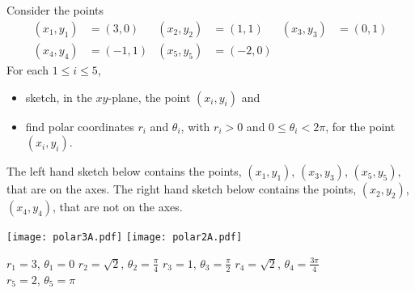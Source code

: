 
\newcommand{\he}{\hat{\mathbf{e}}}



\subsection*{\Conceptual}


\begin{question}
Consider the points
\begin{align*}
(x_1,y_1) &= (3,0) &
(x_2,y_2) &= (1,1)  &
(x_3,y_3) &= (0,1) \\
(x_4,y_4) &= (-1,1) &
(x_5,y_5) &= (-2,0)
\end{align*}
For each $1\le i\le 5$, 
\begin{itemize}
\item
sketch, in the $xy$-plane, the point $(x_i,y_i)$ and
\item
find polar coordinates $r_i$ and $\theta_i$,
with $r_i>0$ and $0\le\theta_i<2\pi$, for the point $(x_i,y_i)$.
\end{itemize}
\end{question}


\begin{answer} 
The left hand sketch below contains the points, $(x_1,y_1)$, $(x_3,y_3)$,
$(x_5,y_5)$, that are on the axes. The right hand sketch below contains the
points, $(x_2,y_2)$, $(x_4,y_4)$, that are not on the axes.
\begin{center}
  \texttt{[image: polar3A.pdf]}\quad
  \texttt{[image: polar2A.pdf]}
\end{center}
    $r_1 = 3$,        $\theta_1=0$\qquad 
    $r_2 = \sqrt{2}$, $\theta_2=\frac{\pi}{4}$\qquad 
    $r_3 = 1$,        $\theta_3=\frac{\pi}{2}$\qquad 
    $r_4 = \sqrt{2}$, $\theta_4=\frac{3\pi}{4}$\\
    $r_5 = 2$,        $\theta_5=\pi$
\end{answer}


